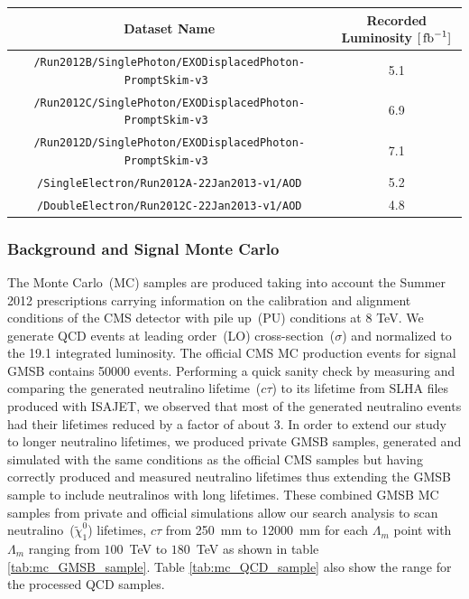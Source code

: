 \begin{center}
\centering
\begin{tabular}{|c c|}
\hline
\bfseries{Dataset Name} & \bfseries{Recorded Luminosity} $[\mbox{\ensuremath{\,\text{fb}^\text{$-$1}}}]$ \\
\hline
 \texttt{/Run2012B/SinglePhoton/EXODisplacedPhoton-PromptSkim-v3 } & 5.1 \\
 \texttt{/Run2012C/SinglePhoton/EXODisplacedPhoton-PromptSkim-v3 } & 6.9 \\
 \texttt{/Run2012D/SinglePhoton/EXODisplacedPhoton-PromptSkim-v3 } & 7.1 \\
\hline\hline
\texttt{/SingleElectron/Run2012A-22Jan2013-v1/AOD} & 5.2 \\
\texttt{/DoubleElectron/Run2012C-22Jan2013-v1/AOD} & 4.8 \\
\hline
\end{tabular}
\label{tab:DATA}
\end{center}


\subsubsection*{Background and Signal Monte Carlo}
The Monte Carlo~(MC) samples are produced taking into account the Summer 2012 prescriptions carrying information on the calibration and alignment conditions of the CMS detector with pile up~(PU) conditions at 8 TeV.
We generate QCD events at leading order~(LO) cross-section~($\sigma$) and normalized to the 19.1 \fbinv integrated luminosity. The official CMS MC production events for signal GMSB contains 50000 events. Performing a quick sanity check by measuring and comparing the generated neutralino lifetime~($c\tau$) to its lifetime from SLHA files produced with ISAJET, we observed that most of the generated neutralino events had their lifetimes reduced by a factor of about 3. In order to extend our study to longer neutralino lifetimes, we produced private GMSB samples, generated and simulated with the same conditions as the official CMS samples but having correctly produced and measured neutralino lifetimes thus extending the GMSB sample to include neutralinos with long lifetimes.
  These combined GMSB MC samples from private and official simulations allow our search analysis to scan neutralino~($\tilde{\chi}^{0}_{1}$) lifetimes, $c\tau$ from 250~mm to 12000~mm for each $\Lambda_{m}$ point with $\Lambda_{m}$ ranging from $100$~TeV to $180$~TeV as shown in table \ref{tab:mc_GMSB_sample}. Table \ref{tab:mc_QCD_sample} also show the \pt range for the processed QCD samples.

